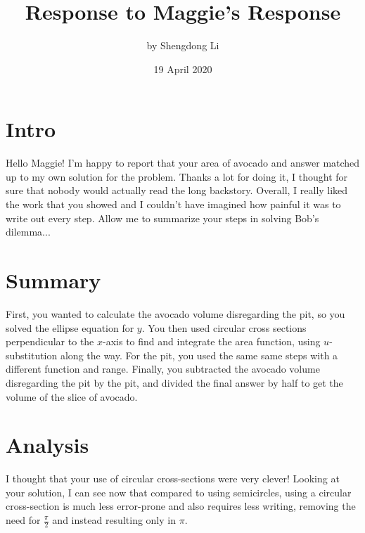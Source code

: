 \documentclass[letterpaper, 12pt]{article}
\begin{document}
\title{Response to Maggie's Response}
\author{by Shengdong Li}
\date{19 April 2020}
\maketitle

\section{Intro}
Hello Maggie! I'm happy to report that your area of avocado and answer matched up to my own solution for the problem. Thanks a lot for doing it, I thought for sure that nobody would actually read the long backstory. Overall, I really liked the work that you showed and I couldn't have imagined how painful it was to write out every step. Allow me to summarize your steps in solving Bob's dilemma...

\section{Summary}
First, you wanted to calculate the avocado volume disregarding the pit, so you solved the ellipse equation for $y$. You then used circular cross sections perpendicular to the $x$-axis to find and integrate the area function, using $u$-substitution along the way. For the pit, you used the same same steps with a different function and range. Finally, you subtracted the avocado volume disregarding the pit by the pit, and divided the final answer by half to get the volume of the slice of avocado.
\section{Analysis}
I thought that your use of circular cross-sections were very clever! Looking at your solution, I can see now that compared to using semicircles, using a circular cross-section is much less error-prone and also requires less writing, removing the need for $\frac{\pi}{2}$ and instead resulting only in $\pi$.
\end{document}
